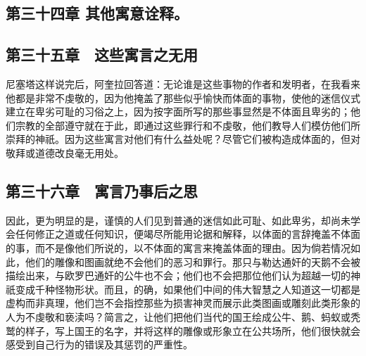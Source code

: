 
\subsection{第三十四章 其他寓意诠释。}

\par


\subsection{第三十五章　这些寓言之无用}

尼塞塔这样说完后，阿奎拉回答道：无论谁是这些事物的作者和发明者，在我看来他都是非常不虔敬的，因为他掩盖了那些似乎愉快而体面的事物，使他的迷信仪式建立在卑劣可耻的习俗之上，因为按字面所写的那些事显然是不体面且卑劣的；他们宗教的全部遵守就在于此，即通过这些罪行和不虔敬，他们教导人们模仿他们所崇拜的神祇。因为这些寓言对他们有什么益处呢？尽管它们被构造成体面的，但对敬拜或道德改良毫无用处。\par


\subsection{第三十六章　寓言乃事后之思}

因此，更为明显的是，谨慎的人们见到普通的迷信如此可耻、如此卑劣，却尚未学会任何修正之道或任何知识，便竭尽所能用论据和解释，以体面的言辞掩盖不体面的事，而不是像他们所说的，以不体面的寓言来掩盖体面的理由。因为倘若情况如此，他们的雕像和图画就绝不会他们的恶习和罪行。那只与勒达通奸的天鹅不会被描绘出来，与欧罗巴通奸的公牛也不会；他们也不会把那位他们认为超越一切的神祇变成千种怪物形状。而且，的确，如果他们中间的伟大智慧之人知道这一切都是虚构而非真理，他们岂不会指控那些为损害神灵而展示此类图画或雕刻此类形象的人为不虔敬和亵渎吗？简言之，让他们把他们当代的国王绘成公牛、鹅、蚂蚁或秃鹫的样子，写上国王的名字，并将这样的雕像或形象立在公共场所，他们很快就会感受到自己行为的错误及其惩罚的严重性。\par


